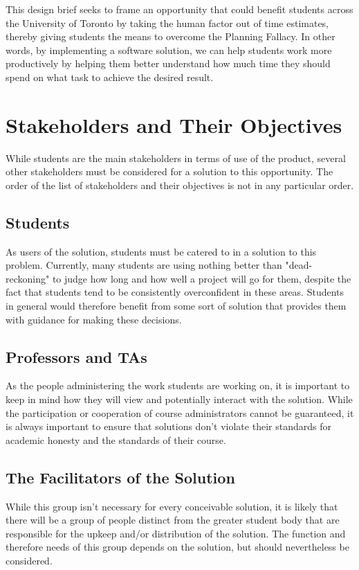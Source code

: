 \documentclass[11pt]{article}
\newenvironment{subs}
  {\adjustwidth{3em}{0pt}}
  {\endadjustwidth}
\begin{document}
    This design brief seeks to frame an opportunity that could benefit students across the University of Toronto by taking the human factor out of time estimates, thereby giving students the means to overcome the Planning Fallacy. In other words, by implementing a software solution, we can help students work more productively by helping them better understand how much time they should spend on what task to achieve the desired result. 
    
    \newpage
\section{Stakeholders and Their Objectives}
    While students are the main stakeholders in terms of use of the product, several other stakeholders must be considered for a solution to this opportunity. The order of the list of stakeholders and their objectives is not in any particular order.
    \begin{subs}
        \subsection{Students}
            As users of the solution, students must be catered to in a solution to this problem. Currently, many students are using nothing better than "dead-reckoning" to judge how long and how well a project will go for them, despite the fact that students tend to be consistently overconfident in these areas. Students in general would therefore benefit from some sort of solution that provides them with guidance for making these decisions. 

        \subsection{Professors and TAs}
            As the people administering the work students are working on, it is important to keep in mind how they will view and potentially interact with the solution. While the participation or cooperation of course administrators cannot be guaranteed, it is always important to ensure that solutions don't violate their standards for academic honesty and the standards of their course.  

        \subsection{The Facilitators of the Solution}
            While this group isn't necessary for every conceivable solution, it is likely that there will be a group of people distinct from the greater student body that are responsible for the upkeep and/or distribution of the solution. The function and therefore needs of this group depends on the solution, but should nevertheless be considered.
      \end{subs}
\end{document}
